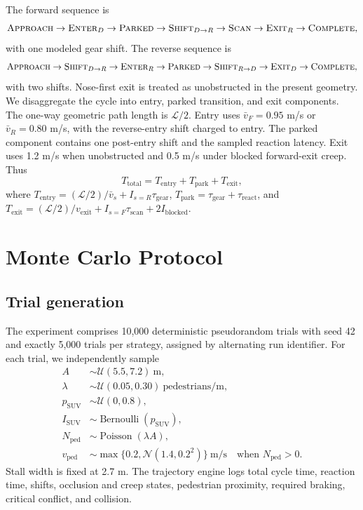 \documentclass[11pt]{article}
\begin{document}
The forward sequence is
\begin{equation}
\textsc{Approach}\rightarrow\textsc{Enter}_{D}\rightarrow\textsc{Parked}
\rightarrow\textsc{Shift}_{D\to R}\rightarrow\textsc{Scan}
\rightarrow\textsc{Exit}_{R}\rightarrow\textsc{Complete},
\end{equation}
with one modeled gear shift. The reverse sequence is
\begin{equation}
\textsc{Approach}\rightarrow\textsc{Shift}_{D\to R}\rightarrow\textsc{Enter}_{R}
\rightarrow\textsc{Parked}\rightarrow\textsc{Shift}_{R\to D}
\rightarrow\textsc{Exit}_{D}\rightarrow\textsc{Complete},
\end{equation}
with two shifts. Nose-first exit is treated as unobstructed in the present geometry. We disaggregate the cycle into entry, parked transition, and exit components. The one-way geometric path length is $\mathcal{L}/2$. Entry uses $\bar v_F=0.95$ m/s or $\bar v_R=0.80$ m/s, with the reverse-entry shift charged to entry. The parked component contains one post-entry shift and the sampled reaction latency. Exit uses 1.2 m/s when unobstructed and 0.5 m/s under blocked forward-exit creep. Thus
\begin{equation}
 T_{\mathrm{total}}=T_{\mathrm{entry}}+T_{\mathrm{park}}+T_{\mathrm{exit}},
\label{eq:time}
\end{equation}
where $T_{\mathrm{entry}}=(\mathcal{L}/2)/\bar v_s+I_{s=R}\tau_{\mathrm{gear}}$, $T_{\mathrm{park}}=\tau_{\mathrm{gear}}+\tau_{\mathrm{react}}$, and $T_{\mathrm{exit}}=(\mathcal{L}/2)/v_{\mathrm{exit}}+I_{s=F}\tau_{\mathrm{scan}}+2I_{\mathrm{blocked}}$.

\section{Monte Carlo Protocol}

\subsection{Trial generation}

The experiment comprises 10,000 deterministic pseudorandom trials with seed 42 and exactly 5,000 trials per strategy, assigned by alternating run identifier. For each trial, we independently sample
\begin{align}
 A &\sim \mathcal{U}(5.5,7.2)\ \mathrm{m},\\
 \lambda &\sim \mathcal{U}(0.05,0.30)\ \mathrm{pedestrians/m},\\
 p_{\mathrm{SUV}} &\sim \mathcal{U}(0,0.8),\\
 I_{\mathrm{SUV}} &\sim \operatorname{Bernoulli}(p_{\mathrm{SUV}}),\\
 N_{\mathrm{ped}} &\sim \operatorname{Poisson}(\lambda A),\\
 v_{\mathrm{ped}} &\sim \max\{0.2,\mathcal{N}(1.4,0.2^2)\}\ \mathrm{m/s}
 \quad\text{when }N_{\mathrm{ped}}>0.
\end{align}
Stall width is fixed at 2.7 m. The trajectory engine logs total cycle time, reaction time, shifts, occlusion and creep states, pedestrian proximity, required braking, critical conflict, and collision.
\end{document}
